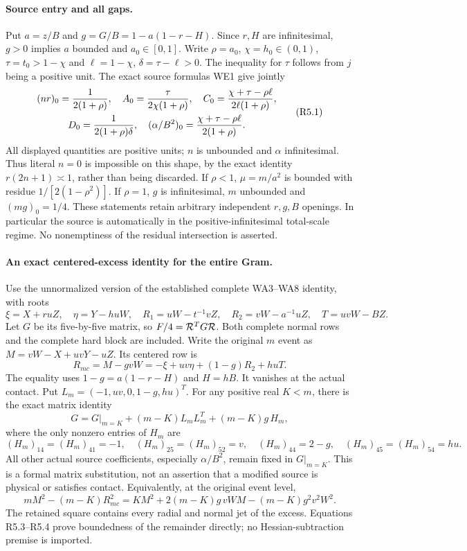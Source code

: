 \paragraph{Source entry and all gaps.}
Put $a=z/B$ and $g=G/B=1-a(1-r-H)$. Since $r,H$ are infinitesimal,
$g>0$ implies $a$ bounded and $a_0\in[0,1]$. Write $\rho=a_0$,
$\chi=h_0\in(0,1)$, $\tau=t_0>1-\chi$ and $\ell=1-\chi$,
$\delta=\tau-\ell>0$. The inequality for $\tau$ follows from $j$
being a positive unit. The exact source formulas WE1 give jointly
\[
\begin{gathered}
 (nr)_0={1\over2(1+\rho)},\quad
 A_0={\tau\over2\chi(1+\rho)},\quad
 C_0={\chi+\tau-\rho\ell\over2\ell(1+\rho)},\\
 D_0={1\over2(1+\rho)\delta},\quad
 (\alpha/B^2)_0={\chi+\tau-\rho\ell\over2(1+\rho)}.
\end{gathered}       \tag{R5.1}
\]
All displayed quantities are positive units; $n$ is unbounded and
$\alpha$ infinitesimal. Thus literal $n=0$ is impossible on this shape,
by the exact identity $r(2n+1)\asymp1$, rather than being discarded.
If $\rho<1$, $\mu=m/a^2$ is bounded with residue
$1/[2(1-\rho^2)]$. If $\rho=1$, $g$ is infinitesimal,
$m$ unbounded and $(mg)_0=1/4$. These statements retain arbitrary
independent $r,g,B$ openings. In particular the source is automatically
in the positive-infinitesimal total-scale regime. No nonemptiness of
the residual intersection is asserted.

\paragraph{An exact centered-excess identity for the entire Gram.}
Use the unnormalized version of the established complete WA3--WA8 identity,
with roots
\[
 \xi=X+ruZ,\quad\eta=Y-huW,\quad
 R_1=uW-t^{-1}vZ,\quad R_2=vW-a^{-1}uZ,\quad T=uvW-BZ.
\]
Let $G$ be its five-by-five matrix, so $F/4={\cal R}^TG{\cal R}$.
Both complete normal rows and the complete hard block are included.
Write the original $m$ event as $M=vW-X+uvY-uZ$. Its centered row is
\[
 R_{mc}=M-gvW=-\xi+uv\eta+(1-g)R_2+huT.             \tag{R5.2}
\]
The equality uses $1-g=a(1-r-H)$ and $H=hB$. It vanishes at the
actual contact. Put $L_m=(-1,uv,0,1-g,hu)^T$.
For any positive real $K<m$, there is the exact matrix identity
\[
 G=G\big|_{m=K}+(m-K)L_mL_m^T+(m-K)g\,H_m,          \tag{R5.3}
\]
where the only nonzero entries of $H_m$ are
\[
 (H_m)_{14}=(H_m)_{41}=-1,\quad
 (H_m)_{25}=(H_m)_{52}=v,\quad
 (H_m)_{44}=2-g,\quad
 (H_m)_{45}=(H_m)_{54}=hu.                           \tag{R5.4}
\]
All other actual source coefficients, especially $\alpha/B^2$, remain
fixed in $G|_{m=K}$. This is a formal matrix substitution, not an assertion
that a modified source is physical or satisfies contact. Equivalently,
at the original event level,
\[
 mM^2-(m-K)R_{mc}^2
 =KM^2+2(m-K)g\,vWM-(m-K)g^2v^2W^2.                \tag{R5.5}
\]
The retained square contains every radial and normal jet of the excess.
Equations R5.3--R5.4 prove boundedness of the remainder directly; no
Hessian-subtraction premise is imported.

